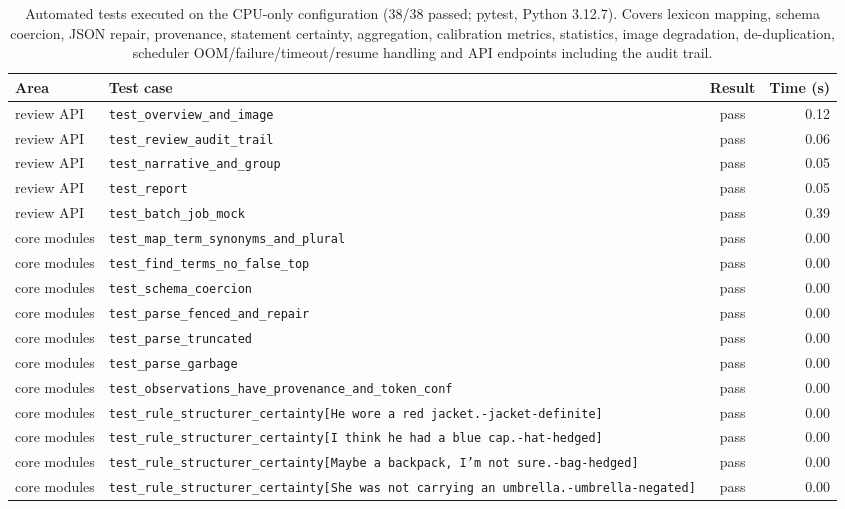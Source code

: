 \begin{table}[!t]
\centering
\scriptsize
\caption{Automated tests executed on the CPU-only configuration (38/38 passed; pytest, Python 3.12.7). Covers lexicon mapping, schema coercion, JSON repair, provenance, statement certainty, aggregation, calibration metrics, statistics, image degradation, de-duplication, scheduler OOM/failure/timeout/resume handling and API endpoints including the audit trail.}
\label{tab:supp_tests}
\begin{adjustbox}{max width=\textwidth}
\begin{tabular}{llcr}
\toprule
Area & Test case & Result & Time (s) \\
\midrule
review API & \texttt{test\_overview\_and\_image} & pass & 0.12 \\
review API & \texttt{test\_review\_audit\_trail} & pass & 0.06 \\
review API & \texttt{test\_narrative\_and\_group} & pass & 0.05 \\
review API & \texttt{test\_report} & pass & 0.05 \\
review API & \texttt{test\_batch\_job\_mock} & pass & 0.39 \\
core modules & \texttt{test\_map\_term\_synonyms\_and\_plural} & pass & 0.00 \\
core modules & \texttt{test\_find\_terms\_no\_false\_top} & pass & 0.00 \\
core modules & \texttt{test\_schema\_coercion} & pass & 0.00 \\
core modules & \texttt{test\_parse\_fenced\_and\_repair} & pass & 0.00 \\
core modules & \texttt{test\_parse\_truncated} & pass & 0.00 \\
core modules & \texttt{test\_parse\_garbage} & pass & 0.00 \\
core modules & \texttt{test\_observations\_have\_provenance\_and\_token\_conf} & pass & 0.00 \\
core modules & \texttt{test\_rule\_structurer\_certainty[He wore a red jacket.-jacket-definite]} & pass & 0.00 \\
core modules & \texttt{test\_rule\_structurer\_certainty[I think he had a blue cap.-hat-hedged]} & pass & 0.00 \\
core modules & \texttt{test\_rule\_structurer\_certainty[Maybe a backpack, I'm not sure.-bag-hedged]} & pass & 0.00 \\
core modules & \texttt{test\_rule\_structurer\_certainty[She was not carrying an umbrella.-umbrella-negated]} & pass & 0.00 \\

\end{tabular}
\end{adjustbox}
\end{table}
